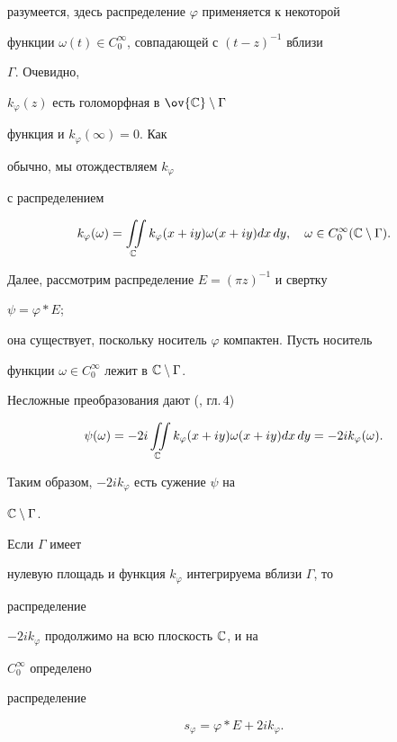 разумеется, здесь распределение $\varphi$ применяется к некоторой 


функции $\omega(t)\in C^\infty_0$, совпадающей с $(t-z)^{-1}$ вблизи 


$\Gamma$. Очевидно, 


$k_\varphi(z)$ есть голоморфная в $\ov{\Bbb C}\setminus\Gamma$ 


функция и $k_\varphi(\infty)=0$. Как 


обычно, мы отождествляем $k_\varphi$ 


с распределением 


$$


k_\varphi(\omega)=\iint\limits_{\Bbb C} k_\varphi 


(x+iy)\omega(x+iy)dx\,dy,\quad 


\omega\in C^\infty_0(\Bbb C\setminus\Gamma). 


$$


 


Далее, рассмотрим распределение $E=(\pi z)^{-1}$ и свертку 


$\psi=\varphi* E$; 


она существует, поскольку носитель $\varphi$ компактен. Пусть носитель 


функции $\omega\in C^\infty_0$ лежит в $\Bbb C\setminus\Gamma$. 


Несложные преобразования дают (\cite{12}, гл.\,4) 


$$ 


\psi(\omega)=-2i\iint\limits_{\Bbb C}k_\varphi(x+iy) 


\omega(x+iy)dx\,dy=-2i k_\varphi(\omega). 


$$ 


Таким образом, $-2i k_\varphi$ есть сужение $\psi$ на 


$\Bbb C\setminus\Gamma$. 


Если $\Gamma$ имеет 


нулевую площадь и функция $k_\varphi$ интегрируема вблизи $\Gamma$, то 


распределение 


$-2i k_\varphi$ продолжимо на всю плоскость $\Bbb C$, и на 


$C^\infty_0$ определено 


распределение 


\begin{equation} 


s_\varphi=\varphi*E+2i k_\varphi. 


\end{equation} 


